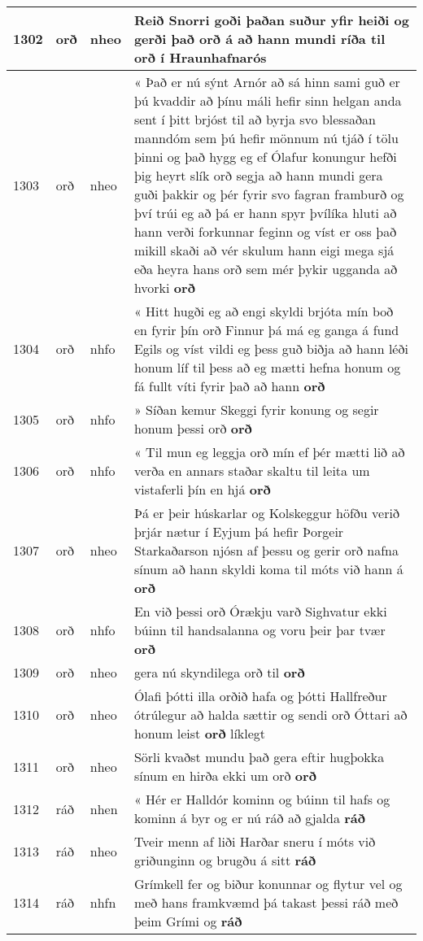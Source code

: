 \documentclass{article}
\begin{document}
\begin{longtable}{p{1cm}|p{1cm}|p{1cm}|p{13cm}}
\hline
1302&orð&nheo&Reið Snorri goði þaðan suður yfir heiði og gerði það orð á að hann mundi ríða til \textbf{orð} í Hraunhafnarós\\
\hline
1303&orð&nheo&« Það er nú sýnt Arnór að sá hinn sami guð er þú kvaddir að þínu máli hefir sinn helgan anda sent í þitt brjóst til að byrja svo blessaðan manndóm sem þú hefir mönnum nú tjáð í tölu þinni og það hygg eg ef Ólafur konungur hefði þig heyrt slík orð segja að hann mundi gera guði þakkir og þér fyrir svo fagran framburð og því trúi eg að þá er hann spyr þvílíka hluti að hann verði forkunnar feginn og víst er oss það mikill skaði að vér skulum hann eigi mega sjá eða heyra hans orð sem mér þykir ugganda að hvorki \textbf{orð} \\
\hline
1304&orð&nhfo&« Hitt hugði eg að engi skyldi brjóta mín boð en fyrir þín orð Finnur þá má eg ganga á fund Egils og víst vildi eg þess guð biðja að hann léði honum líf til þess að eg mætti hefna honum og fá fullt víti fyrir það að hann \textbf{orð} \\
\hline
1305&orð&nhfo&» Síðan kemur Skeggi fyrir konung og segir honum þessi orð \textbf{orð} \\
\hline
1306&orð&nhfo&« Til mun eg leggja orð mín ef þér mætti lið að verða en annars staðar skaltu til leita um vistaferli þín en hjá \textbf{orð} \\
\hline
1307&orð&nheo&Þá er þeir húskarlar og Kolskeggur höfðu verið þrjár nætur í Eyjum þá hefir Þorgeir Starkaðarson njósn af þessu og gerir orð nafna sínum að hann skyldi koma til móts við hann á \textbf{orð} \\
\hline
1308&orð&nhfo&En við þessi orð Órækju varð Sighvatur ekki búinn til handsalanna og voru þeir þar tvær \textbf{orð} \\
\hline
1309&orð&nheo&gera nú skyndilega orð til \textbf{orð} \\
\hline
1310&orð&nheo&Ólafi þótti illa orðið hafa og þótti Hallfreður ótrúlegur að halda sættir og sendi orð Óttari að honum leist \textbf{orð} líklegt\\
\hline
1311&orð&nheo&Sörli kvaðst mundu það gera eftir hugþokka sínum en hirða ekki um orð \textbf{orð} \\
\hline
1312&ráð&nhen&« Hér er Halldór kominn og búinn til hafs og kominn á byr og er nú ráð að gjalda \textbf{ráð} \\
\hline
1313&ráð&nheo&Tveir menn af liði Harðar sneru í móts við griðunginn og brugðu á sitt \textbf{ráð} \\
\hline
1314&ráð&nhfn&Grímkell fer og biður konunnar og flytur vel og með hans framkvæmd þá takast þessi ráð með þeim Grími og \textbf{ráð} \\

\end{longtable}
\end{document}

